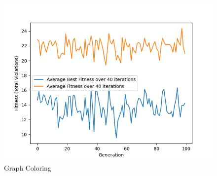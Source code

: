 \documentclass[11pt, letterpaper]{article}
\begin{document}
\begin{figure}[H]
  \includegraphics[width=\linewidth]{images/graphcoloring_rb_rd.png}
  \caption{Graph Coloring}
\endminipage
\end{figure}
\end{document}
